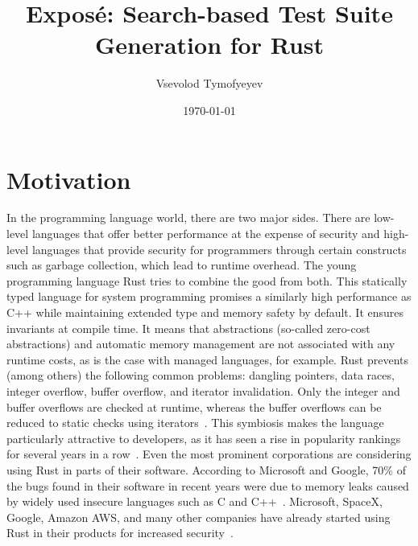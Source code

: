 \documentclass{article}
\begin{document}
\title{Exposé: Search-based Test Suite Generation for Rust}
\author{Vsevolod Tymofyeyev}
\date{\today}
\maketitle

\section{Motivation}
In the programming language world, there are two major sides. There are low-level languages that offer better performance at the expense of security and high-level languages that provide security for programmers through certain constructs such as garbage collection, which lead to runtime overhead. The young programming language Rust tries to combine the good from both. This statically typed language for system programming promises a similarly high performance as C++ while maintaining extended type and memory safety by default. It ensures invariants at compile time. It means that abstractions (so-called zero-cost abstractions) and automatic memory management are not associated with any runtime costs, as is the case with managed languages, for example. Rust prevents (among others) the following common problems: dangling pointers, data races, integer overflow, buffer overflow, and iterator invalidation. Only the integer and buffer overflows are checked at runtime, whereas the buffer overflows can be reduced to static checks using iterators~\cite{Anderson2016}. This symbiosis makes the language particularly attractive to developers, as it has seen a rise in popularity rankings for several years in a row~\cite{StackOverflow2020}. Even the most prominent corporations are considering using Rust in parts of their software. According to Microsoft and Google, 70\% of the bugs found in their software in recent years were due to memory leaks caused by widely used insecure languages such as C and C++~\cite{Microsoft2019MemoryBugs, RustInAndroid}. Microsoft, SpaceX, Google, Amazon AWS, and many other companies have already started using Rust in their products for increased security~\cite{MicrosoftJoinsRust, AmazonLovesRust, RustInAndroid, GoogleRustFoundation}.
\end{document}
